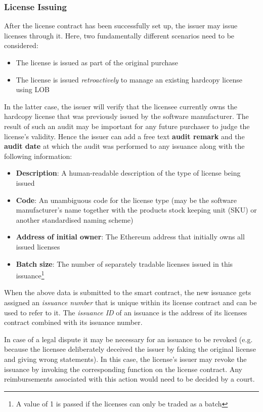 \documentclass[a4paper]{article}
\begin{document}
\subsubsection{License Issuing}
\label{ch:licenseContractIssuing}

After the license contract has been successfully set up, the issuer may issue licenses through it. Here, two fundamentally different scenarios need to be considered:
\begin{itemize}
  \item The license is issued as part of the original purchase
  \item The license is issued \emph{retroactively} to manage an existing hardcopy license using LOB
\end{itemize}

In the latter case, the issuer will verify that the licensee currently owns the hardcopy license that was previously issued by the software manufacturer. The result of such an audit may be important for any future purchaser to judge the license's validity. Hence the issuer can add a free text \textbf{audit remark} and the \textbf{audit date} at which the audit was performed to any issuance along with the following information:

\begin{itemize}
  \item \textbf{Description}: A human-readable description of the type of license being issued
  \item \textbf{Code}: An unambiguous code for the license type (may be the software manufacturer's name together with the products stock keeping unit (SKU) or another standardised naming scheme)
  \item \textbf{Address of initial owner}: The Ethereum address that initially owns all issued licenses
  \item \textbf{Batch size}: The number of separately tradable licenses issued in this issuance\footnote{A value of 1 is passed if the licenses can only be traded as a batch}
\end{itemize}

When the above data is submitted to the smart contract, the new issuance gets assigned an \emph{issuance number} that is unique within its license contract and can be used to refer to it. The \emph{issuance ID} of an issuance is the address of its licenses contract combined with its issuance number.

In case of a legal dispute it may be necessary for an issuance to be revoked (e.g. because the licensee deliberately deceived the issuer by faking the original license and giving wrong statements). In this case, the license's issuer may revoke the issuance by invoking the corresponding function on the license contract. Any reimbursements associated with this action would need to be decided by a court.
\end{document}
